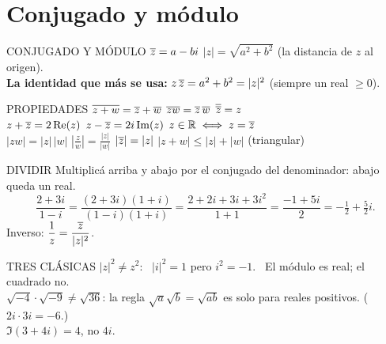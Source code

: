\section{Conjugado y módulo}
\begin{sello}{CONJUGADO Y MÓDULO}
$\overline{z}=a-bi$ \qquad $|z|=\sqrt{a^2+b^2}$ (la distancia de $z$ al origen).\\[3pt]
\textbf{La identidad que más se usa:} $z\,\overline{z}=a^2+b^2=|z|^2$ (siempre un real $\ge0$).
\end{sello}
\begin{memo}{PROPIEDADES}
$\overline{z+w}=\overline{z}+\overline{w}$ \quad $\overline{zw}=\overline{z}\,\overline{w}$ \quad $\overline{\overline{z}}=z$\\
$z+\overline{z}=2\operatorname{Re}(z)$ \quad $z-\overline{z}=2i\operatorname{Im}(z)$ \quad $z\in\mathbb{R}\iff z=\overline{z}$\\
$|zw|=|z|\,|w|$ \quad $\left|\frac zw\right|=\frac{|z|}{|w|}$ \quad $|\overline{z}|=|z|$ \quad $|z+w|\le|z|+|w|$ (triangular)
\end{memo}
\begin{metodo}{DIVIDIR}
Multiplicá arriba y abajo por el conjugado del denominador: abajo queda un real.
\[\frac{2+3i}{1-i}=\frac{(2+3i)(1+i)}{(1-i)(1+i)}=\frac{2+2i+3i+3i^2}{1+1}=\frac{-1+5i}{2}=-\tfrac12+\tfrac52i.\]
Inverso: $\dfrac1z=\dfrac{\overline{z}}{|z|^2}$.
\end{metodo}
\begin{trampa}{TRES CLÁSICAS}
$|z|^2\neq z^2$: \ $|i|^2=1$ pero $i^2=-1$. \ El módulo es real; el cuadrado no.\\
$\sqrt{-4}\cdot\sqrt{-9}\neq\sqrt{36}$: la regla $\sqrt a\sqrt b=\sqrt{ab}$ es solo para reales positivos. ($2i\cdot3i=-6$.)\\
$\Im(3+4i)=4$, no $4i$.
\end{trampa}

